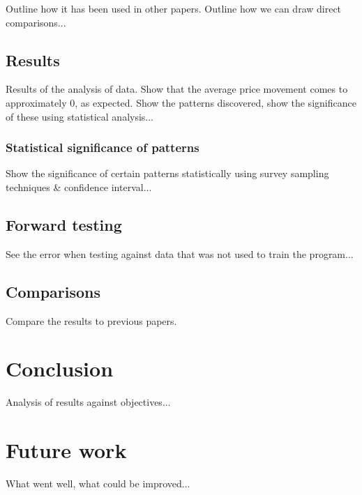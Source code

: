 \documentclass{article}
\begin{document}
Outline how it has been used in other papers. Outline how we can draw direct comparisons...

\subsection{Results}

Results of the analysis of data. Show that the average price movement comes to approximately 0, as expected. Show the patterns discovered, show the significance of these using statistical analysis...

\subsubsection{Statistical significance of patterns}

Show the significance of certain patterns statistically using survey sampling techniques \& confidence interval...

\subsection{Forward testing}

See the error when testing against data that was not used to train the program...

\subsection{Comparisons}

Compare the results to previous papers.

\section{Conclusion}

Analysis of results against objectives...

\section{Future work}

What went well, what could be improved...



\end{document}

